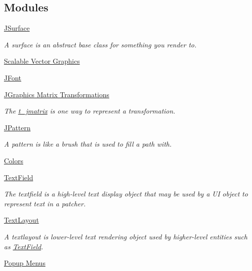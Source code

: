 \subsection*{Modules}
\begin{DoxyCompactItemize}
\item 
\hyperlink{group__jsurface}{JSurface}


\begin{DoxyCompactList}\small\item\em A surface is an abstract base class for something you render to. \item\end{DoxyCompactList}\item 
\hyperlink{group__jsvg}{Scalable Vector Graphics}
\item 
\hyperlink{group__jfont}{JFont}
\item 
\hyperlink{group__jmatrix}{JGraphics Matrix Transformations}


\begin{DoxyCompactList}\small\item\em The \hyperlink{structt__jmatrix}{t\_\-jmatrix} is one way to represent a transformation. \item\end{DoxyCompactList}\item 
\hyperlink{group__jpattern}{JPattern}


\begin{DoxyCompactList}\small\item\em A pattern is like a brush that is used to fill a path with. \item\end{DoxyCompactList}\item 
\hyperlink{group__color}{Colors}
\item 
\hyperlink{group__textfield}{TextField}


\begin{DoxyCompactList}\small\item\em The textfield is a high-\/level text display object that may be used by a UI object to represent text in a patcher. \item\end{DoxyCompactList}\item 
\hyperlink{group__textlayout}{TextLayout}


\begin{DoxyCompactList}\small\item\em A textlayout is lower-\/level text rendering object used by higher-\/level entities such as \hyperlink{group__textfield}{TextField}. \item\end{DoxyCompactList}\item 
\hyperlink{group__jpopupmenu}{Popup Menus}



\end{DoxyCompactItemize}
